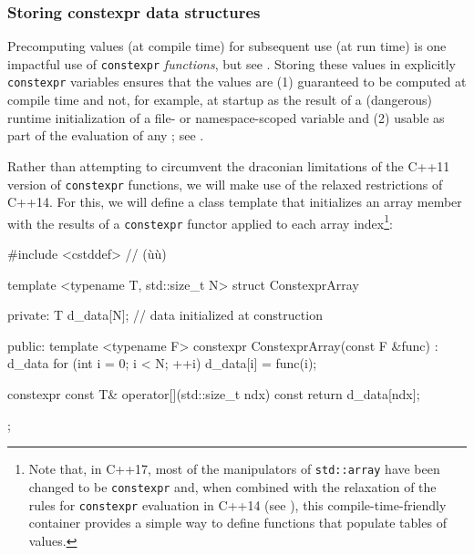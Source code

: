 \subsubsection[Storing \lstinline!constexpr! data structures]{Storing {\SubsubsecCode constexpr} data structures}\label{storing-constexpr-data-structures}

Precomputing values (at compile time) for subsequent use (at run time)
is one impactful use of \lstinline!constexpr! \emph{functions}, but see . Storing these values in explicitly
\lstinline!constexpr! variables ensures that the values are (1) guaranteed
to be computed at compile time and not, for example, at startup as the
result of a (dangerous) runtime initialization of a file- or
namespace-scoped variable and (2) usable as part of the evaluation of
any ; see .

Rather than attempting to circumvent the draconian limitations of the
C++11 version of \lstinline!constexpr! functions, we will make use of the
relaxed restrictions of C++14. For this, we will define a class template
that initializes an array member with the results of a
\lstinline!constexpr! functor applied to each array
index{\cprotect\footnote{Note that, in C++17, most of the manipulators
of \lstinline!std::array! have been changed to be \lstinline!constexpr! and,
when combined with the relaxation of the rules for \lstinline!constexpr!
evaluation in C++14 (see ), this compile-time-friendly container provides a simple way to
  define functions that populate tables of values.}}:

\begin{emcppshiddenlisting}[emcppsbatch=e3,emcppsstandards={c++14}]
#include <cstddef>  // (ù{}ù)
\end{emcppshiddenlisting}
\begin{emcppslisting}[emcppsbatch=e3]
template <typename T, std::size_t N>
struct ConstexprArray
{
private:
    T d_data[N];  // data initialized at construction

public:
    template <typename F>
    constexpr ConstexprArray(const F &func)
    : d_data{}
    {
        for (int i = 0; i < N; ++i)
        {
            d_data[i] = func(i);
        }
    }

    constexpr const T& operator[](std::size_t ndx) const
    {
        return d_data[ndx];
    }
};
\end{emcppslisting}
    
